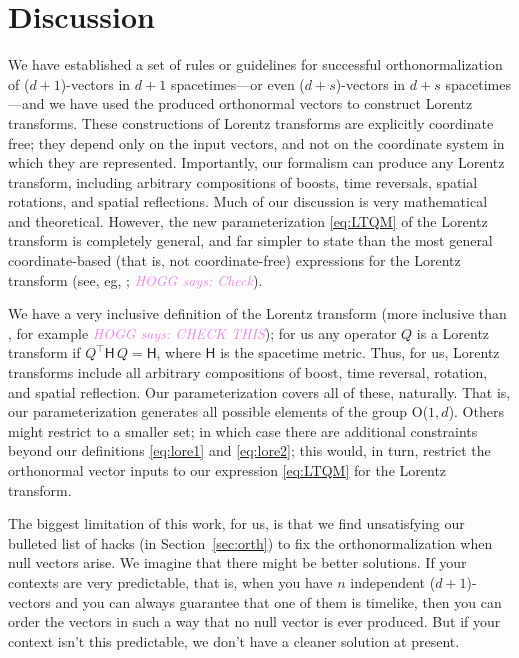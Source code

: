 \documentclass{article}
\newcommand{\metric}{\mathsf{H}}
\newcommand{\plus}{\!+\!} %
\newcommand{\secref}[1]{Section~\ref{#1}}
\newcommand{\HOGG}[1]{\textcolor{violet}{\textsl{HOGG says: {#1}}}}
\begin{document}
\section{Discussion}\label{sec:discussion}

We have established a set of rules or guidelines for successful orthonormalization of ($d\plus1$)-vectors in $d\plus1$ spacetimes---or even ($d\plus s$)-vectors in $d\plus s$ spacetimes---and we have used the produced orthonormal vectors to construct Lorentz transforms.
These constructions of Lorentz transforms are explicitly coordinate free; they depend only on the input vectors, and not on the coordinate system in which they are represented.
Importantly, our formalism can produce any Lorentz transform, including arbitrary compositions of boosts, time reversals, spatial rotations, and spatial reflections.
Much of our discussion is very mathematical and theoretical.
However, the new parameterization \eqref{eq:LTQM} of the Lorentz transform is completely general, and far simpler to state than the most general coordinate-based (that is, not coordinate-free) expressions for the Lorentz transform (see, eg, \cite{haber}; \HOGG{Check}).

We have a very inclusive definition of the Lorentz transform (more inclusive than \cite{haber}, for example \HOGG{CHECK THIS}); for us any operator $Q$ is a Lorentz transform if $Q^\top\metric\,Q=\metric$, where $\metric$ is the spacetime metric.
Thus, for us, Lorentz transforms include all arbitrary compositions of boost, time reversal, rotation, and spatial reflection.
Our parameterization covers all of these, naturally.
That is, our parameterization generates all possible elements of the group O($1,d$).
Others might restrict to a smaller set; in which case there are additional constraints beyond our definitions \eqref{eq:lore1} and \eqref{eq:lore2}; this would, in turn, restrict the orthonormal vector inputs to our expression \eqref{eq:LTQM} for the Lorentz transform.

The biggest limitation of this work, for us, is that we find unsatisfying our bulleted list of hacks (in \secref{sec:orth}) to fix the orthonormalization when null vectors arise.
We imagine that there might be better solutions.
If your contexts are very predictable, that is, when you have $n$ independent ($d\plus1$)-vectors and you can always guarantee that one of them is timelike, then you can order the vectors in such a way that no null vector is ever produced.
But if your context isn't this predictable, we don't have a cleaner solution at present.
\end{document}
